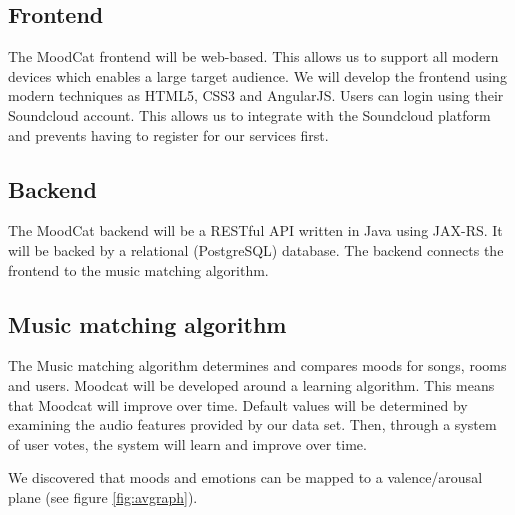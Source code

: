 \documentclass[10pt,a4paper]{article}
\begin{document}
\newpage

\subsection{Frontend}

The MoodCat frontend will be web-based.
This allows us to support all modern devices which enables a large target audience.
We will develop the frontend using modern techniques as HTML5\cite{HTML}, CSS3\cite{CSS} and AngularJS\cite{AngularJS}.
Users can login using their Soundcloud account.
This allows us to integrate with the Soundcloud platform and prevents having to register for our services first.

\subsection{Backend}

The MoodCat backend will be a RESTful\cite{rest} API written in Java using JAX-RS. It will be backed by a relational (PostgreSQL) database. The backend connects the frontend to the music matching algorithm.

\subsection{Music matching algorithm}

The Music matching algorithm determines and compares moods for songs, rooms and users.
Moodcat will be developed around a learning algorithm.
This means that Moodcat will improve over time.
Default values will be determined by examining the audio features provided by our data set.
Then, through a system of user votes, the system will learn and improve over time.

We discovered that moods and emotions can be mapped to a valence/arousal plane\cite{Yang:2006:MEC:1180639.1180665} (see figure \ref{fig:avgraph}).
\end{document}
